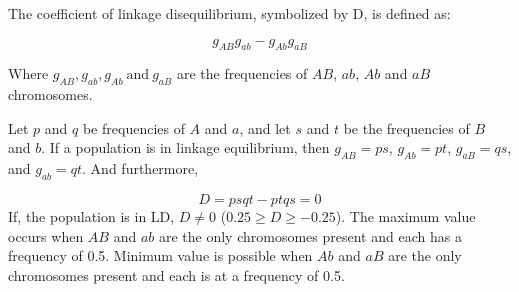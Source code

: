 \documentclass[11pt,dvipsnames,ignorenonframetext,aspectratio=169]{beamer}
\begin{document}
\begin{frame}{}
\protect\hypertarget{section-28}{}
\footnotesize

The coefficient of linkage disequilibrium, symbolized by D, is defined
as:

\[
g_{AB}g_{ab} - g_{Ab}g_{aB}
\]

Where \(g_{AB}, g_{ab}, g_{Ab}~\text{and}~g_{aB}\) are the frequencies
of \(AB\), \(ab\), \(Ab\) and \(aB\) chromosomes.

Let \(p\) and \(q\) be frequencies of \(A\) and \(a\), and let \(s\) and
\(t\) be the frequencies of \(B\) and \(b\). If a population is in
linkage equilibrium, then \(g_{AB} = ps\), \(g_{Ab} = pt\),
\(g_{aB} = qs\), and \(g_{ab} = qt\). And furthermore,

\[
D = psqt -ptqs = 0
\] If, the population is in LD, \(D \neq 0\)
(\(0.25 \geq D \geq - 0.25\)). The maximum value occurs when \(AB\) and
\(ab\) are the only chromosomes present and each has a frequency of 0.5.
Minimum value is possible when \(Ab\) and \(aB\) are the only
chromosomes present and each is at a frequency of 0.5.
\end{frame}
\end{document}
